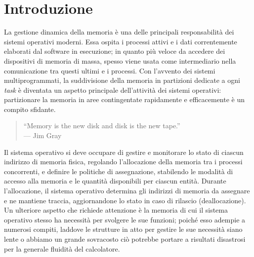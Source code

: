 \chapter{Introduzione}

La gestione dinamica della memoria è una delle principali responsabilità dei sistemi operativi moderni\footnotemark. Essa ospita i processi attivi e i dati correntemente elaborati dal software in esecuzione; in quanto più veloce da accedere dei dispositivi di memoria di massa, spesso viene usata come intermediario nella comunicazione tra questi ultimi e i processi. Con l'avvento dei sistemi multiprogrammati, la suddivisione della memoria in partizioni dedicate a ogni \textit{task} è diventata un aspetto principale dell'attività dei sistemi operativi: partizionare la memoria in aree contingentate rapidamente e efficacemente è un compito sfidante. 

\begin{quote}
“Memory is the new disk and disk is the new tape.”\\
\hfill --- Jim Gray
\end{quote}


Il sistema operativo si deve occupare di gestire e monitorare lo stato di ciascun indirizzo di memoria fisica, regolando l'allocazione della memoria tra i processi concorrenti, e definire le politiche di assegnazione, stabilendo le modalità di accesso alla memoria e le quantità disponibili per ciascun entità. Durante l'allocazione, il sistema operativo determina gli indirizzi di memoria da assegnare e ne mantiene traccia, aggiornandone lo stato in caso di rilascio (deallocazione). Un ulteriore aspetto che richiede attenzione è la memoria di cui il sistema operativo stesso ha necessità per svolgere le sue funzioni; poiché esso adempie a numerosi compiti, laddove le strutture in atto per gestire le sue necessità siano lente o abbiamo un grande sovracosto ciò potrebbe portare a risultati disastrosi per la generale fluidità del calcolatore.

